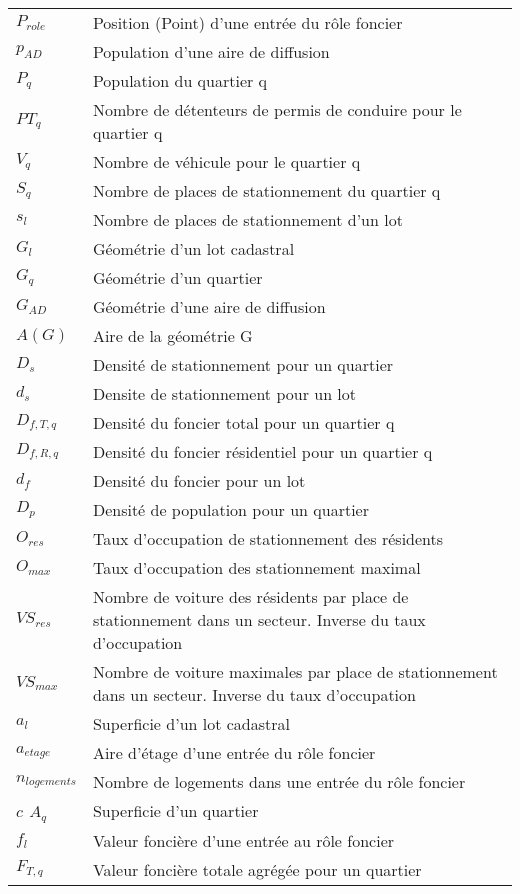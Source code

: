 \begin{longtable}{lp{5in}}
$P_{role}$ & Position (Point) d'une entrée du rôle foncier \\
$p_{AD}$ & Population d'une aire de diffusion\\
$P_q$ & Population du quartier q\\
$PT_{q}$ & Nombre de détenteurs de permis de conduire pour le quartier q\\
$V_q$ & Nombre de véhicule pour le quartier q\\
$S_q$ & Nombre de places de stationnement du quartier q\\
$s_l$ & Nombre de places de stationnement d'un lot\\
$G_l$ & Géométrie d'un lot cadastral \\
$G_q$ & Géométrie d'un quartier\\
$G_{AD}$ & Géométrie d'une aire de diffusion\\
$A(G)$ & Aire de la géométrie G\\
$D_s$ & Densité de stationnement pour un quartier \\
$d_s$ & Densite de stationnement pour un lot\\
$D_{f,T,q}$ & Densité du foncier total pour un quartier q\\
$D_{f,R,q}$ & Densité du foncier résidentiel pour un quartier q\\
$d_f$ & Densité du foncier pour un lot\\
$D_p$ & Densité de population pour un quartier\\
$O_{res}$ & Taux d'occupation de stationnement des résidents \\
$O_{max}$ & Taux d'occupation des stationnement maximal \\
$VS_{res}$ & Nombre de voiture des résidents par place de stationnement dans un secteur. Inverse du taux d'occupation\\ 
$VS_{max}$ & Nombre de voiture maximales par place de stationnement dans un secteur. Inverse du taux d'occupation\\
$a_l$ & Superficie d'un lot cadastral\\
$a_{etage}$ & Aire d'étage d'une entrée du rôle foncier \\
$n_{logements}$ & Nombre de logements dans une entrée du rôle foncier\\
$c_{}$
$A_q$ & Superficie d'un quartier\\
$f_l$ & Valeur foncière d'une entrée au rôle foncier\\
$F_{T,q}$ & Valeur foncière totale agrégée pour un quartier\\

\end{longtable}
